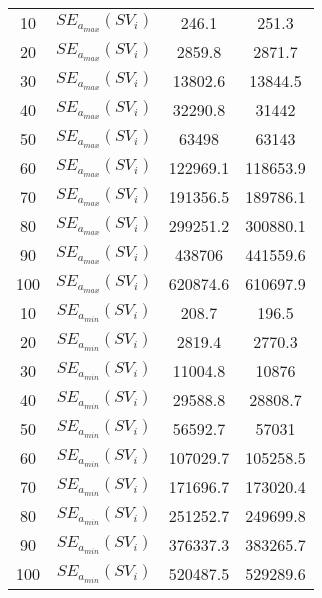 \begin{table}[H]
\begin{tabular}{cc|cc}
		10                & $SE_{a_{max}}(SV_i)$              & 246.1                    & 251.3                            \\
		20                & $SE_{a_{max}}(SV_i)$              & 2859.8                   & 2871.7                           \\
		30                & $SE_{a_{max}}(SV_i)$              & 13802.6                  & 13844.5                          \\
		40                & $SE_{a_{max}}(SV_i)$              & 32290.8                  & 31442                            \\
		50                & $SE_{a_{max}}(SV_i)$              & 63498                    & 63143                            \\
		60                & $SE_{a_{max}}(SV_i)$              & 122969.1                 & 118653.9                         \\
		70                & $SE_{a_{max}}(SV_i)$              & 191356.5                 & 189786.1                         \\
		80                & $SE_{a_{max}}(SV_i)$              & 299251.2                 & 300880.1                         \\
		90                & $SE_{a_{max}}(SV_i)$              & 438706                   & 441559.6                         \\
		100               & $SE_{a_{max}}(SV_i)$              & 620874.6                 & 610697.9                         \\
		10                & $SE_{a_{min}}(SV_i)$            & 208.7                    & 196.5                            \\
		20                & $SE_{a_{min}}(SV_i)$            & 2819.4                   & 2770.3                           \\
		30                & $SE_{a_{min}}(SV_i)$            & 11004.8                  & 10876                            \\
		40                & $SE_{a_{min}}(SV_i)$            & 29588.8                  & 28808.7                          \\
		50                & $SE_{a_{min}}(SV_i)$            & 56592.7                  & 57031                            \\
		60                & $SE_{a_{min}}(SV_i)$            & 107029.7                 & 105258.5                         \\
		70                & $SE_{a_{min}}(SV_i)$            & 171696.7                 & 173020.4                         \\
		80                & $SE_{a_{min}}(SV_i)$            & 251252.7                 & 249699.8                         \\
		90                & $SE_{a_{min}}(SV_i)$            & 376337.3                 & 383265.7                         \\
		100               & $SE_{a_{min}}(SV_i)$            & 520487.5                 & 529289.6                        
	\end{tabular}
\end{table}

